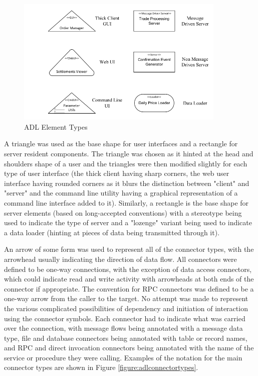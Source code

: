 \begin{figure}
\centering
\includegraphics[width=10cm]{Figures/adls-figure2}
\caption{ADL Element Types}
\label{figure:adlelementtypes}
\end{figure}  


  A triangle was used as the base shape for user interfaces and a rectangle for server resident components.  The triangle was chosen as it hinted at the head and shoulders shape of a user and the triangles were then modified slightly for each type of user interface (the thick client having sharp corners, the web user interface having rounded corners as it blurs the distinction between "client" and "server" and the command line utility having a graphical representation of a command line interface added to it).  Similarly, a rectangle is the base shape for server elements (based on long-accepted conventions) with a stereotype being used to indicate the type of server and a "lozenge" variant being used to indicate a data loader (hinting at pieces of data being transmitted through it).

  An arrow of some form was used to represent all of the connector types, with the arrowhead usually indicating the direction of data flow.  All connectors were defined to be one-way connections, with the exception of data access connectors, which could indicate read and write activity with arrowheads at both ends of the connector if appropriate.  The convention for RPC connectors was defined to be a one-way arrow from the caller to the target.  No attempt was made to represent the various complicated possibilities of dependency and initiation of interaction using the connector symbols.  Each connector had to indicate what was carried over the connection, with message flows being annotated with a message data type, file and database connectors being annotated with table or record names, and RPC and direct invocation connectors being annotated with the name of the service or procedure they were calling.  Examples of the notation for the main connector types are shown in Figure \ref{figure:adlconnectortypes}. 

